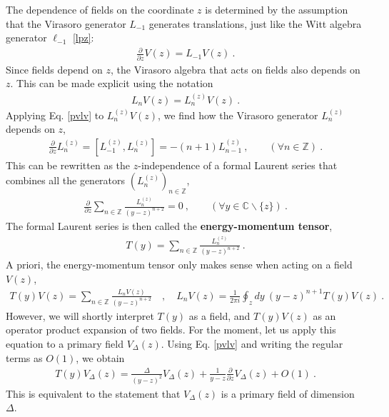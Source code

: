 \documentclass[12pt, a4paper]{article}
\newcommand{\myindex}[1]{\textbf{\boldmath #1}}
\theoremstyle{break}
\begin{document}
The dependence of fields on the coordinate $z$ is determined by the assumption that the Virasoro generator $L_{-1}$ generates translations, just like the Witt algebra generator $\ell_{-1}$ \eqref{lpz}:
\begin{align}
  \boxed{\frac{\partial}{\partial z} V(z) = L_{-1} V(z)}  \ .
  \label{pvlv}
 \end{align}
 Since fields depend on $z$, the Virasoro algebra that acts on fields also depends on $z$. This can be made explicit using the notation
\begin{align}
   L_n V(z) = L_n^{(z)} V(z) \ . 
\end{align}
Applying Eq. \eqref{pvlv} to $L_n^{(z)} V(z)$, we find how the Virasoro generator $L_n^{(z)}$ depends on $z$,
 \begin{align}
 \frac{\partial}{\partial z} L_n^{(z)} = [L_{-1}^{(z)},L_n^{(z)}]= -(n+1)L_{n-1}^{(z)}\ ,\qquad (\forall n\in\mathbb{Z})\ .
\end{align}
This can be rewritten as the $z$-independence of a formal Laurent series that combines all the generators $(L_n^{(z)})_{n\in\mathbb{Z}}$, 
\begin{align}
 \frac{\partial}{\partial z} \sum_{n\in\mathbb{Z}} \frac{L_n^{(z)}}{(y-z)^{n+2}} = 0\ ,\qquad (\forall y\in\mathbb{C}\backslash \{z\})\ .
\end{align}
The formal Laurent series is then called the \myindex{energy-momentum tensor}, 
\begin{align}
  \boxed{T(y) = \sum_{n\in\mathbb{Z}} \frac{L_n^{(z)}}{(y-z)^{n+2}}} \ .
  \label{tl}
 \end{align}
 A priori, the energy-momentum tensor only makes sense when acting on a field $V(z)$,
 \begin{align}
 T(y)V(z) = \sum_{n\in\mathbb{Z}} \frac{L_n V(z)}{(y-z)^{n+2}}\quad , \quad L_n V(z) = \frac{1}{2\pi i} \oint_{z}dy\ (y-z)^{n+1} T(y)V(z)\ .
 \label{lvtv}
\end{align}
However, we will shortly interpret $T(y)$ as a field, and $T(y)V(z)$ as an operator product expansion of two fields. For the moment, let us apply this equation to a primary field $V_\Delta(z)$. Using Eq. \eqref{pvlv} and writing the regular terms as $O(1)$, we obtain
\begin{align}
 \boxed{T(y)V_\Delta(z) = \frac{\Delta}{(y-z)^2} V_\Delta(z) + \frac{1}{y-z} \frac{\partial}{\partial z} V_\Delta(z) + O(1)}\ .
 \label{tvd}
\end{align}
This is equivalent to the statement that $V_\Delta(z)$ is a primary field of dimension $\Delta$.
\end{document}
